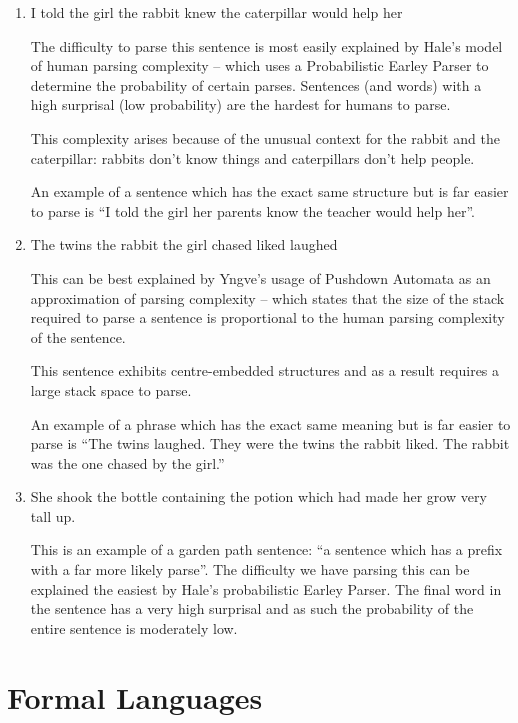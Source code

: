 \documentclass[10pt,\jkfside,a4paper]{article}
\begin{document}
\begin{enumerate}
\begin{enumerate}

\item I told the girl the rabbit knew the caterpillar would help her

The difficulty to parse this sentence is most easily explained by Hale's
model of human parsing complexity -- which uses a Probabilistic Earley Parser
to determine the probability of certain parses. Sentences (and words) with a
high surprisal (low probability) are the hardest for humans to parse.

This complexity arises because of the unusual context for the rabbit and the
caterpillar: rabbits don't know things and caterpillars don't help people.

An example of a sentence which has the exact same structure but is far
easier to parse is ``I told the girl her parents know the teacher would help
her''.

\item The twins the rabbit the girl chased liked laughed

This can be best explained by Yngve's usage of Pushdown Automata as an
approximation of parsing complexity -- which states that the size of the
stack required to parse a sentence is proportional to the human parsing
complexity of the sentence.

This sentence exhibits centre-embedded structures and as a result requires a
large stack space to parse.

An example of a phrase which has the exact same meaning but is far easier
to parse is ``The twins laughed. They were the twins the rabbit liked. The
rabbit was the one chased by the girl.''

\item She shook the bottle containing the potion which had made her grow
very tall up.

This is an example of a garden path sentence: ``a sentence which has a
prefix with a far more likely parse''. The difficulty we have parsing this
can be explained the easiest by Hale's probabilistic Earley Parser. The
final word in the sentence has a very high surprisal and as such the
probability of the entire sentence is moderately low.

\end{enumerate}

\end{enumerate}

\section{Formal Languages}
\end{document}
